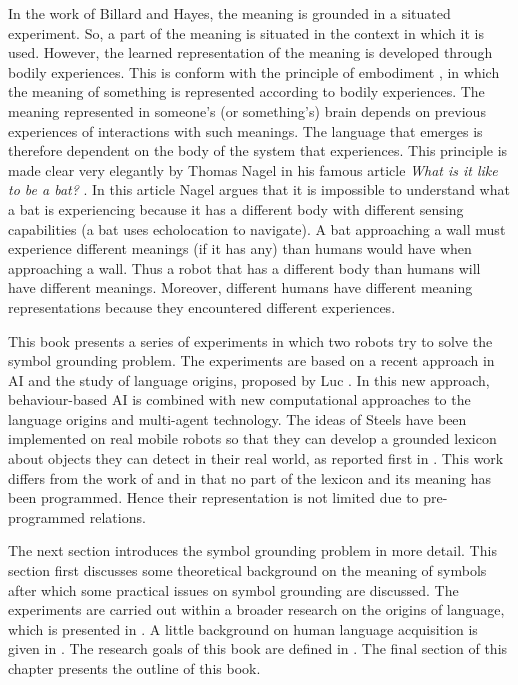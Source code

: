 In the work of Billard and Hayes, the meaning is grounded in a situated experiment. So, a part of the meaning is situated in the context in which it is used. However, the learned representation of the meaning is developed through bodily experiences. This is conform with the principle of {\sc embodiment} \citep{lakoff:1987}, in which the meaning of something is represented according to bodily experiences. The meaning represented in someone's (or something's) brain depends on previous experiences of interactions with such meanings. The language that emerges is therefore dependent on the body of the system that experiences. This principle is made clear very elegantly by Thomas Nagel in his famous article {\em What is it like to be a bat?} \citep{nagel:1974}. In this article Nagel argues that it is impossible to understand what a bat is experiencing because it has a different body with different sensing capabilities (a bat uses echolocation to navigate). A bat approaching a wall must experience different meanings (if it has any) than humans would have when approaching a wall. Thus a robot that has a different body than humans will have different meanings. Moreover, different humans have different meaning representations because they encountered different experiences.

This book presents a series of experiments in which two robots try to solve the symbol grounding problem. The experiments are based on a recent approach in AI and the study of language origins, proposed by Luc \citet{steels:1996a}. In this new approach, behaviour-based AI \citep{steelsbrooks:1993} is combined with new computational approaches to the language origins and multi-agent technology. The ideas of Steels have been implemented on real mobile robots so that they can develop a grounded lexicon about objects they can detect in their real world, as reported first in \citealt{steelsvogt:1997}. This work differs from the work of \citet{yancostein} and \citet{billard:1997a} in that no part of the lexicon and its meaning has been programmed. Hence their representation is not limited due to pre-programmed relations.

The next section introduces the symbol grounding problem in more detail. This section first discusses some theoretical background on the meaning of symbols after which some practical issues on symbol grounding are discussed. The experiments are carried out within a broader research on the origins of language, which is presented in . A little background on human language acquisition is given in . The research goals of this book are defined in . The final section of this chapter presents the outline of this book.

